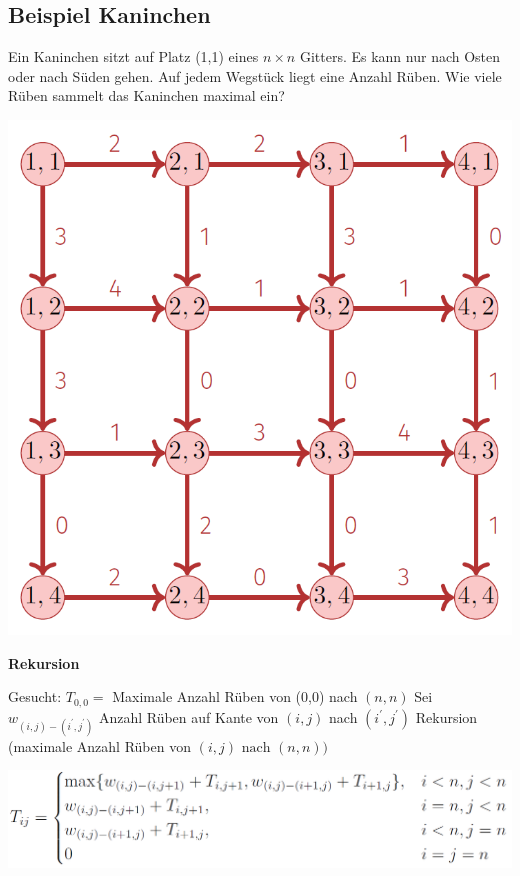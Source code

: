 \begin{sectionbox}
\subsection{Beispiel Kaninchen}\smallskip
Ein Kaninchen sitzt auf Platz (1,1) eines $n \times n$ Gitters. Es kann nur nach Osten oder nach Süden gehen. Auf jedem Wegstück liegt eine Anzahl Rüben. Wie viele Rüben sammelt das Kaninchen maximal ein?\par\smallskip
\begin{center}
    \includegraphics[width = 0.75\columnwidth]{../img/kan1.png}
\end{center}\vspace{7px}

\textbf{Rekursion}\par
Gesucht: $T_{0,0}=$ Maximale Anzahl Rüben von (0,0) nach $(n, n)$ Sei $w_{(i, j)-\left(i^{\prime}, j^{\prime}\right)}$ Anzahl Rüben auf Kante von $(i, j)$ nach $\left(i^{\prime}, j^{\prime}\right)$ Rekursion (maximale Anzahl Rüben von $(i, j) \text { nach }(n, n))$\par\smallskip
\begin{center}
    \includegraphics[width = \columnwidth]{../img/kanRek.png}
\end{center}\vspace{7px}


\end{sectionbox}
